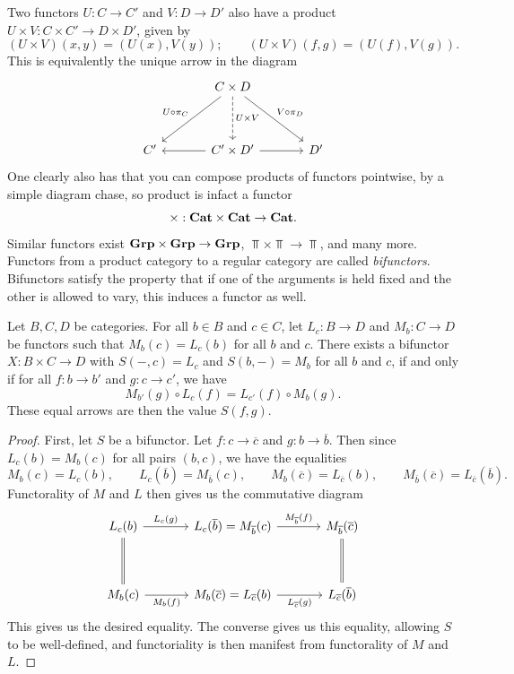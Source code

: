 Two functors $U : C \to C'$ and $V : D \to D'$ also have a product $U\times V : C\times C' \to D\times D'$, given by
\[
	(U\times V)(x,y)=(U(x),V(y));\qquad (U\times V)(f,g)=(U(f),V(g))
.\]
This is equivalently the unique arrow in the diagram
\[\begin{tikzcd}[row sep = 3.5em, column sep = 3.5em]
 & C\times D\ar[" U\circ \pi_C "', dl] \ar[" V\circ \pi _D ", dr] \ar[" U\times V ", dashed, d]  &  \\
C' & C'\times D'\ar[l] \ar[r]  & D'
\end{tikzcd}\]
One clearly also has that you can compose products of functors pointwise, by a simple diagram chase, so product is infact a functor
\[
	\times : \mathbf{Cat} \times \mathbf{Cat}  \to \mathbf{Cat} 
.\]
Similar functors exist $\mathbf{Grp} \times \mathbf{Grp} \to \mathbf{Grp} $, $\Top \times \Top \to \Top $, and many more. Functors from a product category to a regular category are called \emph{bifunctors}. Bifunctors satisfy the property that if one of the arguments is held fixed and the other is allowed to vary, this induces a functor as well.

\begin{proposition}\label{prp:2.1}
	Let $B,C,D$ be categories. For all $b\in B$ and $c\in C$, let $L_c : B \to D$ and $M_b : C \to D$ be functors such that $M_b(c)=L_c(b)$ for all $b$ and $c$. There exists a bifunctor $X : B\times C \to D$ with $S(-,c)=L_c$ and $S(b,-)=M_b$ for all $b$ and $c$, if and only if for all $f : b \to b'$ and $g : c \to c'$, we have
	\[
		M_{b'} (g)\circ L_c(f)=L_{c'} (f) \circ M_b(g)
	.\]
	These equal arrows are then the value $S(f,g)$.
\end{proposition}
\begin{proof}
	First, let $S$ be a bifunctor. Let $f : c \to \overline{c} $ and $g : b \to \overline{b} $. Then since $L_c(b)=M_b(c)$ for all pairs $(b,c)$, we have the equalities
	\[
		M_b(c)=L_c(b),\qquad L_c(\overline{b} )=M_{\overline{b} } (c),\qquad M_b(\overline{c} )=L_{\overline{c} } (b),\qquad M_{\overline{b} } (\overline{c} )=L_{\overline{c} } (\overline{b} )
	.\]
	Functorality of $M$ and $L$ then gives us the commutative diagram
	\[\begin{tikzcd}[row sep = 3.5em, column sep = 3.5em]
	L_c(b)\ar[equals, d] \ar[" L_c(g) ", r]  & L_c(\overline{b} )=M_{\overline{b} } (c)\ar[" M_{\overline{b} } (f) ", r]  & M_{\overline{b} } (\overline{c} )\ar[equals, d]  \\
	M_b(c)\ar[" M_b(f) "', r]  & M_b(\overline{c} )=L_{\overline{c} } (b)\ar[" L_{\overline{c} } (g) "', r]  & L_{\overline{c} } (\overline{b} )
	\end{tikzcd}\]
	This gives us the desired equality. The converse gives us this equality, allowing $S$ to be well-defined, and functoriality is then manifest from functorality of $M$ and $L$.
\end{proof}


